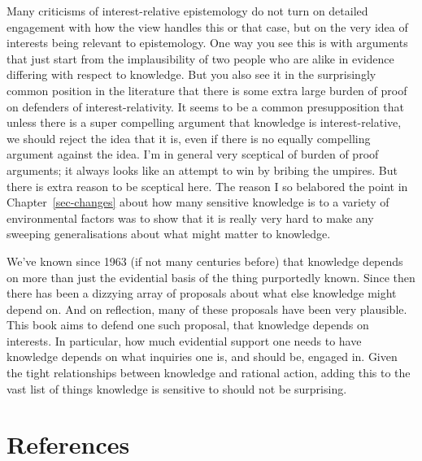 \documentclass[
  12pt,
  letterpaper,
]{scrbook}
\begin{document}
Many criticisms of interest-relative epistemology do not turn on
detailed engagement with how the view handles this or that case, but on
the very idea of interests being relevant to epistemology. One way you
see this is with arguments that just start from the implausibility of
two people who are alike in evidence differing with respect to
knowledge. But you also see it in the surprisingly common position in
the literature that there is some extra large burden of proof on
defenders of interest-relativity. It seems to be a common presupposition
that unless there is a super compelling argument that knowledge is
interest-relative, we should reject the idea that it is, even if there
is no equally compelling argument against the idea. I'm in general very
sceptical of burden of proof arguments; it always looks like an attempt
to win by bribing the umpires. But there is extra reason to be sceptical
here. The reason I so belabored the point in Chapter~\ref{sec-changes}
about how many sensitive knowledge is to a variety of environmental
factors was to show that it is really very hard to make any sweeping
generalisations about what might matter to knowledge.

We've known since 1963 (if not many centuries before) that knowledge
depends on more than just the evidential basis of the thing purportedly
known. Since then there has been a dizzying array of proposals about
what else knowledge might depend on. And on reflection, many of these
proposals have been very plausible. This book aims to defend one such
proposal, that knowledge depends on interests. In particular, how much
evidential support one needs to have knowledge depends on what inquiries
one is, and should be, engaged in. Given the tight relationships between
knowledge and rational action, adding this to the vast list of things
knowledge is sensitive to should not be surprising.


\chapter*{References}\label{references}

\end{document}
